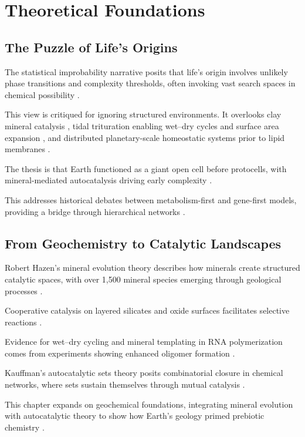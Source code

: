 \documentclass[openany]{book}
\begin{document}
\part{Theoretical Foundations}

\chapter{The Puzzle of Life’s Origins}
The statistical improbability narrative posits that life's origin involves unlikely phase transitions and complexity thresholds, often invoking vast search spaces in chemical possibility \citep{endres2025}.

This view is critiqued for ignoring structured environments. It overlooks clay mineral catalysis \citep{hazen2005}, tidal trituration enabling wet–dry cycles and surface area expansion \citep{toppozada2021}, and distributed planetary-scale homeostatic systems prior to lipid membranes \citep{deamer2017}.

The thesis is that Earth functioned as a giant open cell before protocells, with mineral-mediated autocatalysis driving early complexity \citep{adam2012}.

This addresses historical debates between metabolism-first and gene-first models, providing a bridge through hierarchical networks \citep{kocher2023}.

\chapter{From Geochemistry to Catalytic Landscapes}
Robert Hazen’s mineral evolution theory describes how minerals create structured catalytic spaces, with over 1,500 mineral species emerging through geological processes \citep{hazen2008}.

Cooperative catalysis on layered silicates and oxide surfaces facilitates selective reactions \citep{hazen2001}.

Evidence for wet–dry cycling and mineral templating in RNA polymerization comes from experiments showing enhanced oligomer formation \citep{robertson2012, da2017}.

Kauffman’s autocatalytic sets theory posits combinatorial closure in chemical networks, where sets sustain themselves through mutual catalysis \citep{kauffman1993, hordijk2010}.

This chapter expands on geochemical foundations, integrating mineral evolution with autocatalytic theory to show how Earth's geology primed prebiotic chemistry \citep{hazen2010}.
\end{document}
